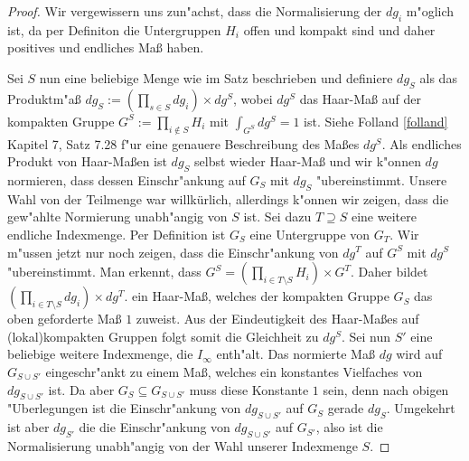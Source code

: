 		\begin{proof}
			Wir vergewissern uns zun"achst, dass die Normalisierung der $dg_i$ m"oglich ist, da per Definiton die Untergruppen $H_i$ offen und kompakt sind und daher positives und endliches Maß haben.
			
			Sei $S$ nun eine beliebige Menge wie im Satz beschrieben und definiere $dg_S$ als das Produktm"aß $dg_S :=\left(\prod_{s \in S}dg_i\right) \times dg^S$, wobei $dg^S$ das Haar-Maß auf der kompakten Gruppe $G^S:=\prod_{i \notin S} H_i$ mit $\int_{G^S} dg^S = 1$ ist. 
			Siehe Folland \ref{folland} Kapitel 7, Satz 7.28 f"ur eine genauere Beschreibung des Maßes $dg^S$. 
			Als endliches Produkt von Haar-Maßen ist $dg_S$ selbst wieder Haar-Maß und wir k"onnen $dg$ normieren, dass dessen Einschr"ankung auf $G_S$ mit $dg_S$ "ubereinstimmt.
			Unsere Wahl von der Teilmenge war willkürlich, allerdings k"onnen wir zeigen, dass die gew"ahlte Normierung unabh"angig von $S$ ist. Sei dazu $T\supseteq S$ eine weitere endliche Indexmenge. 
			Per Definition ist $G_S$ eine Untergruppe von $G_T$. 
			Wir m"ussen jetzt nur noch zeigen, dass die Einschr"ankung von $dg^T$ auf $G^S$ mit $dg^S$ "ubereinstimmt.
			Man erkennt, dass $G^S = \left(\prod_{i \in T \setminus S} H_i\right) \times G^T$. Daher bildet $\left(\prod_{i \in T \setminus S} dg_i\right) \times dg^T$.
			ein Haar-Maß, welches der kompakten Gruppe $G_S$ das oben geforderte Maß $1$ zuweist. Aus der Eindeutigkeit des Haar-Maßes auf (lokal)kompakten Gruppen folgt somit die Gleichheit zu $dg^S$.
			Sei nun $S'$ eine beliebige weitere Indexmenge, die $I_\infty$ enth"alt. Das normierte Maß $dg$ wird auf $G_{S\cup S'}$ eingeschr"ankt zu einem Maß, welches ein konstantes Vielfaches von $dg_{S\cup S'}$ ist. 
			Da aber $G_S \subseteq G_{S\cup S'}$ muss diese Konstante $1$ sein, denn nach obigen "Uberlegungen ist die Einschr"ankung von $dg_{S\cup S'}$ auf $G_S$ gerade $dg_{S}$.
			Umgekehrt ist aber $dg_{S'}$ die die Einschr"ankung von $dg_{S\cup S'}$ auf $G_{S'}$, also ist die Normalisierung unabh"angig von der Wahl unserer Indexmenge $S$.
		\end{proof}
		
